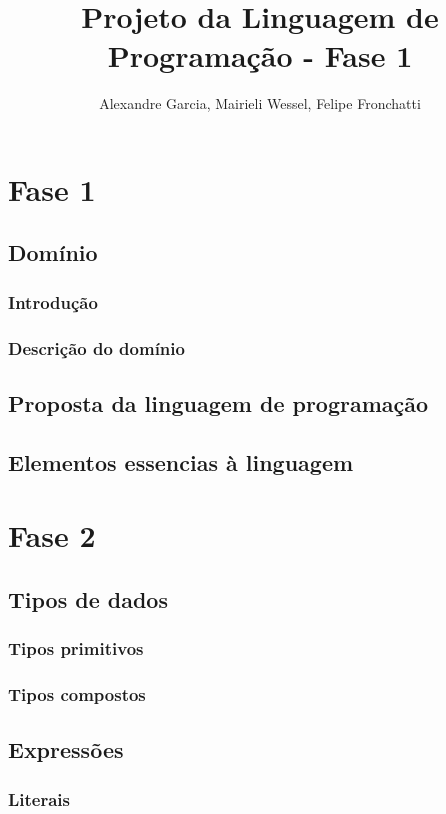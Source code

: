 \documentclass[a4 paper, 12pt]{article}
\title{Projeto da Linguagem de Programa\c c\~ao - Fase 1}
\author{Alexandre Garcia, Mairieli Wessel, Felipe Fronchatti}
\date{}
\begin{document}
\maketitle
\tableofcontents
\section{Fase 1}
\subsection{Dom\'inio}
\subsubsection{Introdu\c c\~ao}

\subsubsection{Descri\c c\~ao do dom\'inio}

\subsection{Proposta da linguagem de programa\c c\~ao}

\subsection{Elementos essencias \`a linguagem}

\section{Fase 2}
\subsection{Tipos de dados}
\subsubsection{Tipos primitivos}
\subsubsection{Tipos compostos}
\subsection{Express\~oes}
\subsubsection{Literais}
\end{document}
